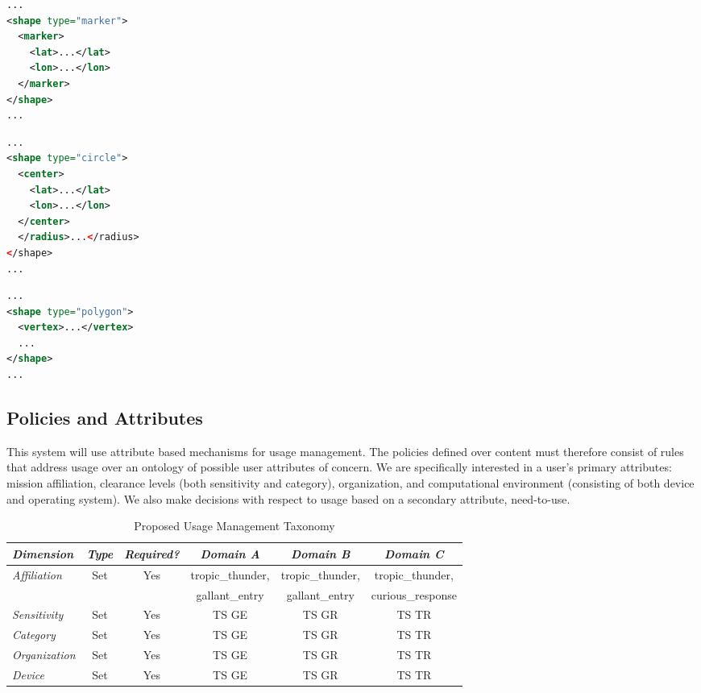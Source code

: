 \par\noindent
\begin{minipage}[t]{.30\textwidth}
\begin{lstlisting}[language=xml, label=lst:marker-shape, caption=Marker]
...
<shape type="marker">
  <marker>
    <lat>...</lat>
    <lon>...</lon>
  </marker>
</shape>
...
\end{lstlisting}
\end{minipage}
\hfill
\begin{minipage}[t]{.30\textwidth}
\begin{lstlisting}[language=xml, label=lst:circle-shape, caption=Circle]
...
<shape type="circle">
  <center>
    <lat>...</lat>
    <lon>...</lon>
  </center>
  </radius>...</radius>
</shape>
...
\end{lstlisting}
\end{minipage}
\hfill
\begin{minipage}[t]{.30\textwidth}
\begin{lstlisting}[language=xml, label=lst:polygon-shape, caption=Polygon]
...
<shape type="polygon">
  <vertex>...</vertex>
  ...
</shape>
...
\end{lstlisting}
\end{minipage}

\subsection{Policies and Attributes}
This system will use attribute based mechanisms for usage management.  The policies defined over content must therefore consist of rules that address usage over an ontology of possible user attributes of concern.  We are specifically interested in a user's primary attributes: mission affiliation, clearance levels (both sensitivity and category), organization, and computational environment (consisting of both device and operating system).  We also make decisions with respect to usage based on a secondary attribute, need-to-use.

\begin{table*}[tp] %
\centering %
\begin{tabular}{lccccc}
\toprule %
\emph{Dimension}		& \emph{Type}	& \emph{Required?}	& \emph{Domain A}	& \emph{Domain B}	& \emph{Domain C} 	\\\toprule %
\emph{Affiliation} 	& Set 			& Yes 				& tropic\_thunder, 	& tropic\_thunder,	& tropic\_thunder, 	\\
					&				&					& gallant\_entry		& gallant\_entry		& curious\_response	\\\midrule
\emph{Sensitivity} 	& Set 			& Yes 				& TS GE 				& TS GR 				& TS TR \\\midrule
\emph{Category}		& Set 			& Yes 				& TS GE 				& TS GR 				& TS TR \\\midrule
\emph{Organization}	& Set 			& Yes 				& TS GE 				& TS GR 				& TS TR \\\midrule
\emph{Device}	 	& Set 			& Yes 				& TS GE 				& TS GR 				& TS TR \\\bottomrule
\end{tabular}
\caption{Proposed Usage Management Taxonomy}
\label{table:model:taxonomy}
\end{table*}

